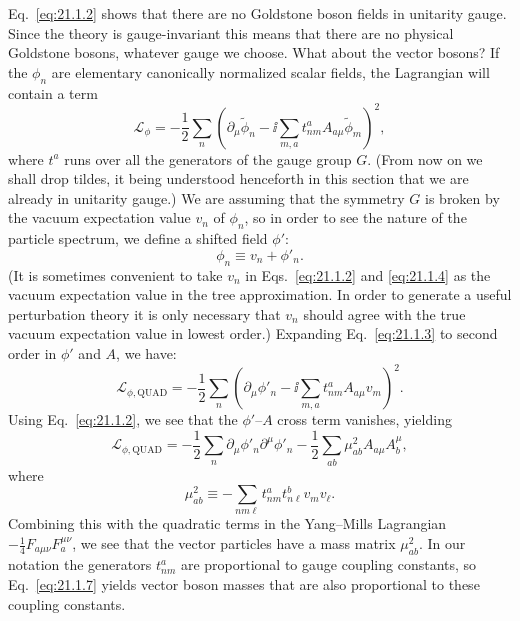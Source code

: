 Eq.~\eqref{eq:21.1.2} shows that there are no Goldstone boson fields in
unitarity gauge. Since the theory is gauge-invariant this means that there
are no physical Goldstone bosons, whatever gauge we choose. What about the
vector bosons? If the $\phi_n$ are elementary canonically normalized scalar
fields, the Lagrangian will contain a term
\begin{equation}
 \mathcal L_\phi
 =-\frac12\sum_n\left(
 \partial_\mu\widetilde{\phi}_n
 -\ii\sum_{m,a}t^a_{nm}A_{a\mu}
 \widetilde{\phi}_m\right)^2,
 \tag{21.1.3}\label{eq:21.1.3}
\end{equation}
where $t^a$ runs over all the generators of the gauge group $G$.
(From now on we shall drop tildes, it being understood henceforth in this
section that we are already in unitarity gauge.) We are assuming that the
symmetry $G$ is broken by the vacuum expectation value $v_n$ of $\phi_n$,
so in order to see the nature of the particle spectrum, we define a shifted
field $\phi'$:
\begin{equation}
 \phi_n\equiv v_n+\phi'_n.
 \tag{21.1.4}\label{eq:21.1.4}
\end{equation}
(It is sometimes convenient to take $v_n$ in Eqs.~\eqref{eq:21.1.2} and
\eqref{eq:21.1.4} as the vacuum expectation value in the tree
approximation. In order to generate a useful perturbation theory it is only
necessary that $v_n$ should agree with the true vacuum expectation value in
lowest order.) Expanding Eq.~\eqref{eq:21.1.3} to second order in $\phi'$
and $A$, we have:
\begin{equation}
 \mathcal L_{\phi,\mathrm{QUAD}}
 =-\frac12\sum_n\left(
 \partial_\mu\phi'_n
 -\ii\sum_{m,a}t^a_{nm}A_{a\mu}v_m\right)^2.
 \tag{21.1.5}\label{eq:21.1.5}
\end{equation}
Using Eq.~\eqref{eq:21.1.2}, we see that the $\phi'$--$A$ cross term
vanishes, yielding
\begin{equation}
 \mathcal L_{\phi,\mathrm{QUAD}}
 =-\frac12\sum_n\partial_\mu\phi'_n\partial^\mu\phi'_n
 -\frac12\sum_{ab}\mu^2_{ab}
 A_{a\mu}A_b^\mu,
 \tag{21.1.6}\label{eq:21.1.6}
\end{equation}
where
\begin{equation}
 \mu^2_{ab}
 \equiv-\sum_{nm\ell}t^a_{nm}t^b_{n\ell}v_mv_\ell.
 \tag{21.1.7}\label{eq:21.1.7}
\end{equation}
Combining this with the quadratic terms in the Yang--Mills Lagrangian
$-\frac14F_{a\mu\nu}F_a^{\mu\nu}$, we see that the vector
particles have a mass matrix $\mu^2_{ab}$. In our notation the
generators $t^a_{nm}$ are proportional to gauge coupling constants, so
Eq.~\eqref{eq:21.1.7} yields vector boson masses that are also proportional
to these coupling constants.

